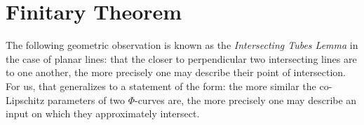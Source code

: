 
    

\section{Finitary Theorem}

\label{section:Finitary_Theorem}

The following geometric observation is known as the \textit{Intersecting Tubes Lemma} in the case of planar lines: that the closer to perpendicular two intersecting lines are to one another, the more precisely one may describe their point of intersection. For us, that generalizes to a statement of the form: the more similar the co-Lipschitz parameters of two $\Phi$-curves are, the more precisely one may describe an input on which they approximately intersect.


